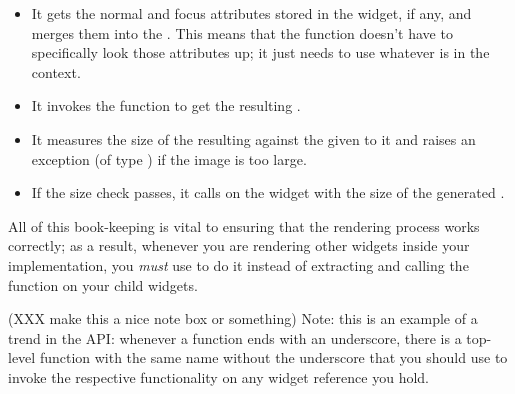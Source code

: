 \begin{itemize}
\item It gets the normal and focus attributes stored in the widget, if
  any, and merges them into the .  This means that
  the  function doesn't have to specifically look those
  attributes up; it just needs to use whatever is in the context.
\item It invokes the  function to get the resulting
  .
\item It measures the size of the resulting  against the
   given to it and raises an exception (of type
  ) if the image is too large.
\item If the size check passes, it calls  on the
  widget with the size of the generated .
\end{itemize}

All of this book-keeping is vital to ensuring that the rendering
process works correctly; as a result, whenever you are rendering other
widgets inside your  implementation, you \textit{must}
use  to do it instead of extracting and calling the
 function on your child widgets.

\label{note:api_convention_1}
(XXX make this a nice note box or something)
Note: this is an example of a trend in the API: whenever a
 function ends with an underscore, there is a
top-level function with the same name without the underscore that
you should use to invoke the respective functionality on any widget
reference you hold.
